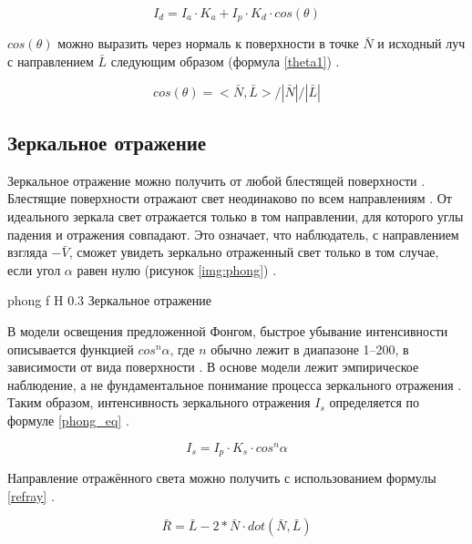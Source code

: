 \begin{equation}
	\label{lambert1}
	I_d = I_a \cdot K_a + I_p \cdot K_d \cdot cos(\theta)
\end{equation}

$cos{(\theta)}$ можно выразить через нормаль к поверхности в точке $\bar{N}$ и исходный луч  с направлением $\bar{L}$ следующим образом (формула \ref{theta1}) \cite{kgmmgtu}.

\begin{equation}
	\label{theta1}
	cos(\theta) = <\bar{N}, \bar{L}> / |\bar{N}| / |\bar{L}|
\end{equation}

\subsection{Зеркальное отражение}

Зеркальное отражение можно получить от любой блестящей поверхности \cite{kgtomsk}. Блестящие поверхности отражают свет неодинаково по всем направлениям \cite{kgtomsk}. 
От идеального зеркала свет отражается только в том направлении, для которого углы падения и отражения совпадают. 
Это означает, что наблюдатель, с направлением взгляда $-\bar{V}$, сможет увидеть зеркально отраженный свет только в том случае, если угол $\alpha$ равен нулю (рисунок \ref{img:phong}) \cite{kgtomsk}.

{phong}
{f}
{H}
{0.3\textwidth}
{Зеркальное отражение}

В модели освещения предложенной Фонгом, быстрое убывание интенсивности описывается функцией $cos^{n}{\alpha}$, где $n$ обычно лежит в диапазоне 1–200, в зависимости от вида поверхности \cite{kgtomsk}. 
В основе модели лежит эмпирическое наблюдение, а не фундаментальное понимание процесса зеркального отражения \cite{kgtomsk}.
Таким образом, интенсивность зеркального отражения $I_s$ определяется по формуле \ref{phong_eq} \cite{kgtomsk}.

\begin{equation}
	\label{phong_eq}
	I_s = I_p \cdot K_s \cdot cos^{n}{\alpha}
\end{equation}

Направление отражённого света можно получить с использованием формулы \ref{refray} \cite{kgmmgtu}.

\begin{equation}
	\label{refray}
	\bar{R} = \bar{L} - 2 * \bar{N} \cdot dot(\bar{N}, \bar{L})
\end{equation}

